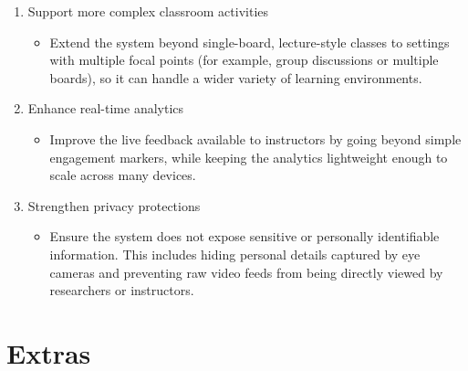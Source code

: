 \documentclass{article}
\begin{document}
\begin{enumerate}
    \item Support more complex classroom activities
    \begin{itemize}
        \item Extend the system beyond single-board, lecture-style classes to settings with multiple focal points (for example, group discussions or multiple boards), so it can handle a wider variety of learning environments.
    \end{itemize}

    \item Enhance real-time analytics
    \begin{itemize}
        \item Improve the live feedback available to instructors by going beyond simple engagement markers, while keeping the analytics lightweight enough to scale across many devices.
    \end{itemize}

    \item Strengthen privacy protections
    \begin{itemize}
        \item Ensure the system does not expose sensitive or personally identifiable information. This includes hiding personal details captured by eye cameras and preventing raw video feeds from being directly viewed by researchers or instructors.
    \end{itemize}
\end{enumerate}

\section{Extras}


\end{document}
